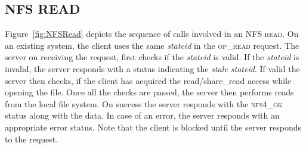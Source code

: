 \subsection{NFS READ}
Figure~\ref{fig:NFSRead} depicts the sequence of calls involved in an \textsc{NFS read}. On an existing system, the client uses the same \textit{stateid} in the \textsc{op\_read} request. The server on receiving the request, first checks if the \textit{stateid} is valid. If the \textit{stateid} is invalid, the server responds with a status indicating the \textit{stale stateid}. If valid the server then checks, if the client has acquired the read/share\_read access while opening the file. Once all the checks are passed, the server then performs reads from the local file system. On success the server responds with the \textsc{nfs4\_ok} status along with the data. In case of an error, the server responds with an appropriate error status. Note that the client is blocked until the server responds to the request.

